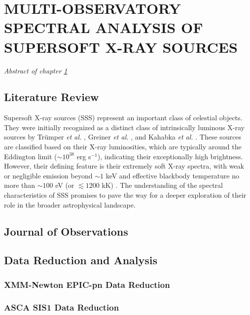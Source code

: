 \chapter{MULTI-OBSERVATORY SPECTRAL ANALYSIS OF SUPERSOFT X-RAY SOURCES} \label{chap:multi-obs}
    \minitoc
    \emph{Abstract of chapter \ref{chap:multi-obs}}
    
    \section{Literature Review} \label{multi-obs:lit-rev}
    	Supersoft X-ray sources (SSS) represent an important class of celestial objects. They were initially recognized as a distinct class of intrinsically luminous X-ray sources by Trümper \textit{et al.} \cite{trumper1991x}, Greiner \textit{et al.} \cite{greiner1991rosat}, and Kahabka \textit{et al.} \cite{kahabka97}. These sources are classified based on their X-ray luminosities, which are typically around the Eddington limit ($\sim 10^{38}$ erg s$^{-1}$), indicating their exceptionally high brightness. However, their defining feature is their extremely soft X-ray spectra, with weak or negligible emission beyond $\sim 1$ keV and effective blackbody temperature no more than $\sim 100$ eV (or $\lesssim 1200$ kK) \cite{kahabka06}. The understanding of the spectral characteristics of SSS promises to pave the way for a deeper exploration of their role in the broader astrophysical landscape.
    
    \section{Journal of Observations} \label{multi-obs:journal}
    
    \section{Data Reduction and Analysis} \label{multi-obs:red-analysis}
    
    	\subsection{XMM-Newton EPIC-pn Data Reduction} \label{multi-obs:red-analysis:epic-pn}
    	
    	\subsection{ASCA SIS1 Data Reduction} \label{multi-obs:red-analysis:sis1}
    	
